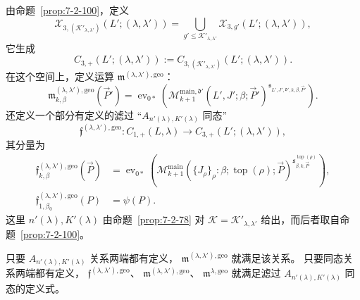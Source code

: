 由命题~\ref{prop:7-2-100}，定义
\[
\mathcal X_{3,(\mathcal K'_{\lambda,\lambda'})}
(L';(\lambda,\lambda'))
=\bigcup_{g'\le\mathcal K'_{\lambda,\lambda'}}
\mathcal X_{3,g'}(L';(\lambda,\lambda')),
\]
它生成
\[
C_{3,+}(L';(\lambda,\lambda'))
:=C_{3,(\mathcal K'_{\lambda,\lambda'})}
(L';(\lambda,\lambda')).
\]
在这个空间上，定义运算
$\mathfrak m^{(\lambda,\lambda'),\mathrm{geo}}$：
\begin{equation}
\mathfrak m^{(\lambda,\lambda'),\mathrm{geo}}_{k,\beta}
(\vec P')=
\operatorname{ev}_{0*}\left(
\mathcal M^{\mathrm{main},\mathfrak d'}_{k+1}
(L',J';\beta;\vec P')
^{\mathfrak s_{L',J',\mathfrak d',k,\beta,\vec P'}}
\right).
\tag{7.2.123}\label{eq:7-2-123}
\end{equation}
还定义一个部分有定义的滤过
``$A_{n'(\lambda),K'(\lambda)}$ 同态''
\[
\mathfrak f^{(\lambda,\lambda'),\mathrm{geo}}
\colon C_{1,+}(L,\lambda)
\longrightarrow C_{3,+}(L';(\lambda,\lambda')),
\]
其分量为
\begin{align}
\mathfrak f^{(\lambda,\lambda'),\mathrm{geo}}_{k,\beta}
(\vec P)
&=\operatorname{ev}_{0*}\left(
\mathcal M^{\mathrm{main}}_{k+1}
(\{J_\rho\}_\rho:\beta;
\operatorname{top}(\rho);\vec P)
^{\mathfrak s^{\operatorname{top}(\rho)}_{\beta,k,\vec P}}
\right),
\tag{7.2.124.1}\label{eq:7-2-124-1}\\
\mathfrak f^{(\lambda,\lambda'),\mathrm{geo}}_{1,\beta_0}
(P)&=\psi(P).
\tag{7.2.124.2}\label{eq:7-2-124-2}
\end{align}
这里 $n'(\lambda),K'(\lambda)$
由命题~\ref{prop:7-2-78}
对 $\mathcal K=\mathcal K'_{\lambda,\lambda'}$
给出，而后者取自命题~\ref{prop:7-2-100}。

只要 $A_{n'(\lambda),K'(\lambda)}$
关系两端都有定义，
$\mathfrak m^{(\lambda,\lambda'),\mathrm{geo}}$
就满足该关系。
只要同态关系两端都有定义，
$\mathfrak f^{(\lambda,\lambda'),\mathrm{geo}}$、
$\mathfrak m^{(\lambda,\lambda'),\mathrm{geo}}$、
$\mathfrak m^{\lambda,\mathrm{geo}}$
就满足滤过 $A_{n'(\lambda),K'(\lambda)}$
同态的定义式。

